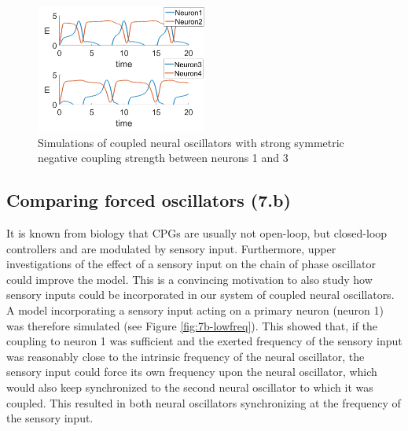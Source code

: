 \documentclass[a4paper]{scrartcl}
\begin{document}
\begin{figure}[!h]
	\centering
	\includegraphics[width=0.5\textwidth]{fig/crazy.png}
	\caption{Simulations of coupled neural oscillators with strong symmetric negative coupling strength between neurons 1 and 3}\label{crazy}
\end{figure}



\newpage
\subsection{Comparing forced oscillators (7.b)}

It is known from biology that CPGs are usually not open-loop, but closed-loop controllers and are modulated by sensory input. Furthermore, upper investigations of the effect of a sensory input on the chain of phase oscillator could improve the model. This is a convincing motivation to also study how sensory inputs could be incorporated in our system of coupled neural oscillators.
A model incorporating a sensory input acting on a primary neuron (neuron 1) was therefore simulated (see Figure \ref{fig:7b-lowfreq}). This showed that, if the coupling to neuron 1 was sufficient and the exerted frequency of the sensory input was reasonably close to the intrinsic frequency of the neural oscillator, the sensory input could force its own frequency upon the neural oscillator, which would also keep synchronized to the second neural oscillator to which it was coupled. This resulted in both neural oscillators synchronizing at the frequency of the sensory input.
\end{document}
